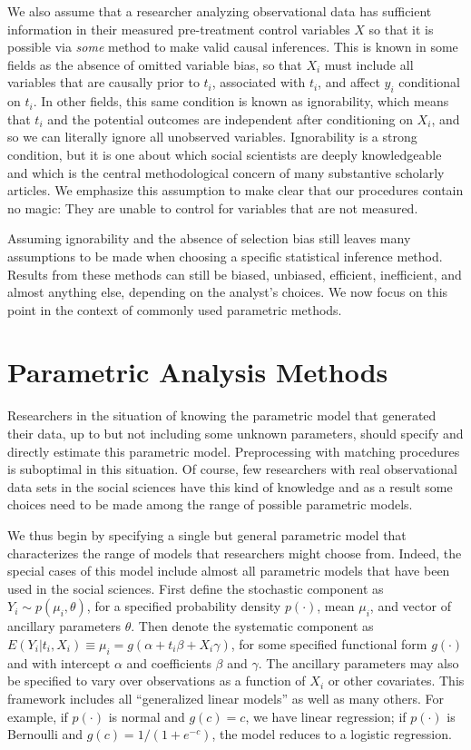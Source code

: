 \documentclass[11pt,titlepage]{article}
\begin{document}
We also assume that a researcher analyzing observational data has
sufficient information in their measured pre-treatment control
variables $X$ so that it is possible via \emph{some} method to make
valid causal inferences.  This is known in some fields as the absence
of omitted variable bias, so that $X_i$ must include all variables
that are causally prior to $t_i$, associated with $t_i$, and affect
$y_i$ conditional on $t_i$.  In other fields, this same condition is
known as ignorability, which means that $t_i$ and the potential
outcomes are independent after conditioning on $X_i$, and so we can
literally ignore all unobserved variables.  Ignorability is a strong
condition, but it is one about which social scientists are deeply
knowledgeable and which is the central methodological concern of many
substantive scholarly articles.  We emphasize this assumption to make
clear that our procedures contain no magic: They are unable to control
for variables that are not measured.

Assuming ignorability and the absence of selection bias still leaves
many assumptions to be made when choosing a specific statistical
inference method.  Results from these methods can still be biased,
unbiased, efficient, inefficient, and almost anything else, depending
on the analyst's choices.  We now focus on this point in the context
of commonly used parametric methods.

\section{Parametric Analysis Methods}

Researchers in the situation of knowing the parametric model that
generated their data, up to but not including some unknown parameters,
should specify and directly estimate this parametric model.
Preprocessing with matching procedures is suboptimal in this
situation.  Of course, few researchers with real observational data
sets in the social sciences have this kind of knowledge and as a
result some choices need to be made among the range of possible
parametric models.

We thus begin by specifying a single but general parametric model that
characterizes the range of models that researchers might choose from.
Indeed, the special cases of this model include almost all parametric
models that have been used in the social sciences.  First define the
stochastic component as $Y_i \sim p(\mu_i,\theta)$, for a specified
probability density $p(\cdot)$, mean $\mu_i$, and vector of ancillary
parameters $\theta$.  Then denote the systematic component as
$E(Y_i|t_i,X_i)\equiv\mu_i=g(\alpha + t_i\beta + X_i\gamma)$, for some
specified functional form $g(\cdot)$ and with intercept $\alpha$ and
coefficients $\beta$ and $\gamma$.  The ancillary parameters may also
be specified to vary over observations as a function of $X_i$ or other
covariates.  This framework includes all ``generalized linear models''
as well as many others.  For example, if $p(\cdot)$ is normal and
$g(c)=c$, we have linear regression; if $p(\cdot)$ is Bernoulli and
$g(c)=1/(1+e^{-c})$, the model reduces to a logistic regression.
\end{document}
